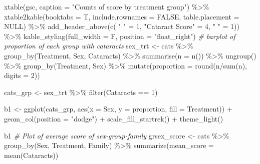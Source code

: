 \documentclass[12pt]{article}
\newenvironment{Shaded}{\begin{snugshade}}{\end{snugshade}}
\newcommand{\AttributeTok}[1]{\textcolor[rgb]{0.77,0.63,0.00}{#1}}
\newcommand{\CommentTok}[1]{\textcolor[rgb]{0.56,0.35,0.01}{\textit{#1}}}
\newcommand{\ConstantTok}[1]{\textcolor[rgb]{0.00,0.00,0.00}{#1}}
\newcommand{\DecValTok}[1]{\textcolor[rgb]{0.00,0.00,0.81}{#1}}
\newcommand{\FunctionTok}[1]{\textcolor[rgb]{0.00,0.00,0.00}{#1}}
\newcommand{\NormalTok}[1]{#1}
\newcommand{\OtherTok}[1]{\textcolor[rgb]{0.56,0.35,0.01}{#1}}
\newcommand{\SpecialCharTok}[1]{\textcolor[rgb]{0.00,0.00,0.00}{#1}}
\newcommand{\StringTok}[1]{\textcolor[rgb]{0.31,0.60,0.02}{#1}}
\begin{document}
\begin{Shaded}
\begin{Highlighting}[]
\FunctionTok{xtable}\NormalTok{(gsc, }\AttributeTok{caption =} \StringTok{"Counts of score by treatment group"}\NormalTok{) }\SpecialCharTok{\%\textgreater{}\%}
  \FunctionTok{xtable2kable}\NormalTok{(}\AttributeTok{booktabs =}\NormalTok{ T,}
               \AttributeTok{include.rownames =} \ConstantTok{FALSE}\NormalTok{,}
               \AttributeTok{table.placement =} \ConstantTok{NULL}\NormalTok{) }\SpecialCharTok{\%\textgreater{}\%}
  \FunctionTok{add\_header\_above}\NormalTok{(}\FunctionTok{c}\NormalTok{( }\StringTok{" "} \OtherTok{=} \DecValTok{1}\NormalTok{, }\StringTok{"Cataract Score"} \OtherTok{=} \DecValTok{4}\NormalTok{, }\StringTok{" "} \OtherTok{=} \DecValTok{1}\NormalTok{)) }\SpecialCharTok{\%\textgreater{}\%}
  \FunctionTok{kable\_styling}\NormalTok{(}\AttributeTok{full\_width =}\NormalTok{ F, }\AttributeTok{position =} \StringTok{"float\_right"}\NormalTok{) }
\CommentTok{\# barplot of proportion of each group with cataracts}
\NormalTok{sex\_trt }\OtherTok{\textless{}{-}}\NormalTok{ cats }\SpecialCharTok{\%\textgreater{}\%}
  \FunctionTok{group\_by}\NormalTok{(Treatment, Sex, Cataracts) }\SpecialCharTok{\%\textgreater{}\%}
  \FunctionTok{summarise}\NormalTok{(}\AttributeTok{n =} \FunctionTok{n}\NormalTok{()) }\SpecialCharTok{\%\textgreater{}\%}
  \FunctionTok{ungroup}\NormalTok{() }\SpecialCharTok{\%\textgreater{}\%}
  \FunctionTok{group\_by}\NormalTok{(Treatment, Sex) }\SpecialCharTok{\%\textgreater{}\%}
  \FunctionTok{mutate}\NormalTok{(}\AttributeTok{proportion =} \FunctionTok{round}\NormalTok{(n}\SpecialCharTok{/}\FunctionTok{sum}\NormalTok{(n), }\AttributeTok{digits =} \DecValTok{2}\NormalTok{))}

\NormalTok{cats\_grp }\OtherTok{\textless{}{-}}\NormalTok{ sex\_trt }\SpecialCharTok{\%\textgreater{}\%}
  \FunctionTok{filter}\NormalTok{(Cataracts }\SpecialCharTok{==} \DecValTok{1}\NormalTok{)}

\NormalTok{b1 }\OtherTok{\textless{}{-}} \FunctionTok{ggplot}\NormalTok{(cats\_grp, }\FunctionTok{aes}\NormalTok{(}\AttributeTok{x =}\NormalTok{ Sex, }\AttributeTok{y =}\NormalTok{ proportion, }\AttributeTok{fill =}\NormalTok{ Treatment)) }\SpecialCharTok{+}
  \FunctionTok{geom\_col}\NormalTok{(}\AttributeTok{position =} \StringTok{"dodge"}\NormalTok{) }\SpecialCharTok{+}
  \FunctionTok{scale\_fill\_startrek}\NormalTok{() }\SpecialCharTok{+}
  \FunctionTok{theme\_light}\NormalTok{() }

\NormalTok{b1}
\CommentTok{\# Plot of average score of sex{-}group{-}family}
\NormalTok{grsex\_score }\OtherTok{\textless{}{-}}\NormalTok{ cats }\SpecialCharTok{\%\textgreater{}\%}
  \FunctionTok{group\_by}\NormalTok{(Sex, Treatment, Family) }\SpecialCharTok{\%\textgreater{}\%}
  \FunctionTok{summarize}\NormalTok{(}\AttributeTok{mean\_score =} \FunctionTok{mean}\NormalTok{(Cataracts))}


\end{Highlighting}
\end{Shaded}
\end{document}
